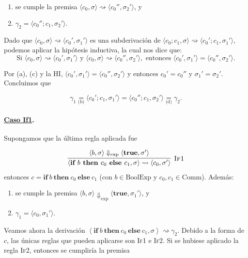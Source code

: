 \documentclass[12pt, a4paper]{article}
\begin{document}
\begin{enumerate}
    \item[c.] se cumple la premisa $\langle c_0,\sigma\rangle
    \rightsquigarrow
    \langle c_0'',\sigma_2'\rangle$, y

    \item[d.] $\gamma_2
    =
    \langle c_0'';c_1,\sigma_2'\rangle$.
\end{enumerate}

Dado que
$
\langle c_0,\sigma\rangle
\rightsquigarrow
\langle c_0',\sigma_1'\rangle
$
es una subderivación de
$
\langle c_0;c_1,\sigma\rangle
\rightsquigarrow
\langle c_0';c_1,\sigma_1'\rangle,
$
podemos aplicar la hipótesis inductiva, la cual nos dice que:
\[
\text{Si } \langle c_0,\sigma\rangle \rightsquigarrow \langle c_0',\sigma_1'\rangle
\text{ y } \langle c_0,\sigma\rangle \rightsquigarrow \langle c_0'',\sigma_2'\rangle,
\text{ entonces } \langle c_0',\sigma_1'\rangle = \langle c_0'',\sigma_2'\rangle.
\]

Por (a), (c) y la HI,
$
\langle c_0',\sigma_1'\rangle
=
\langle c_0'',\sigma_2'\rangle
$
y entonces
$
c_0'=c_0''
$
y
$
\sigma_1'=\sigma_2'
$. Concluimos que

\[
\gamma_1
\underset{\text{(b)}}{=}
\langle c_0';c_1,\sigma_1'\rangle
=
\langle c_0'';c_1,\sigma_2'\rangle
\underset{\text{(d)}}{=}
\gamma_2.
\]


\paragraph{\underline{Caso If1}.}
Supongamos que la última regla aplicada fue

\[
  \infer[\textsc{If1}]{\langle \textbf{if } b \textbf{ then } c_0 \textbf{ else } c_1, \sigma \rangle \rightsquigarrow \langle c_0, \sigma' \rangle}{\langle b, \sigma \rangle \Downarrow_{\text{exp}} \langle \textbf{true}, \sigma' \rangle}
\]
entonces $c = \textbf{if}\ b\ \textbf{then}\ c_0\ \textbf{else}\ c_1$ (con $b\in\mathrm{BoolExp}$ y $c_0,c_1\in\mathrm{Comm}$). Además:
\begin{enumerate}[itemsep=0pt]
    \item[a.] se cumple la premisa $\langle b,\sigma\rangle
    \Downarrow_{\mathrm{exp}}
    \langle \textbf{true},\sigma_1'\rangle$, y

    \item[b.] $\gamma_1
    =
    \langle c_0,\sigma_1'\rangle$.
\end{enumerate}

Veamos ahora la derivación
$
\left\langle
\textbf{if}\ b\ \textbf{then}\ c_0\ \textbf{else}\ c_1,\sigma
\right\rangle
\rightsquigarrow
\gamma_2
$.
Debido a la forma de $c$, las únicas reglas que pueden aplicarse son
\textsc{If1} e \textsc{If2}. Si se hubiese aplicado la regla \textsc{If2}, entonces se cumpliría la premisa
\end{document}
